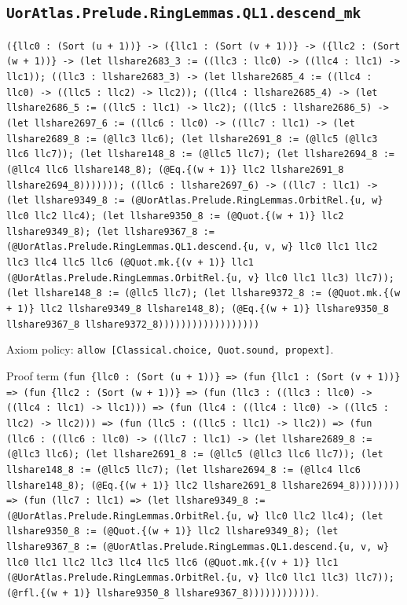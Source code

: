 \documentclass[11pt]{article}
\begin{document}
\subsection*{\texttt{UorAtlas.Prelude.RingLemmas.QL1.descend\_mk}}
\noindent\texttt{(\{llc0 : (Sort (u + 1))\} -> (\{llc1 : (Sort (v + 1))\} -> (\{llc2 : (Sort (w + 1))\} -> (let llshare2683\_3 := ((llc3 : llc0) -> ((llc4 : llc1) -> llc1)); ((llc3 : llshare2683\_3) -> (let llshare2685\_4 := ((llc4 : llc0) -> ((llc5 : llc2) -> llc2)); ((llc4 : llshare2685\_4) -> (let llshare2686\_5 := ((llc5 : llc1) -> llc2); ((llc5 : llshare2686\_5) -> (let llshare2697\_6 := ((llc6 : llc0) -> ((llc7 : llc1) -> (let llshare2689\_8 := (@llc3 llc6); (let llshare2691\_8 := (@llc5 (@llc3 llc6 llc7)); (let llshare148\_8 := (@llc5 llc7); (let llshare2694\_8 := (@llc4 llc6 llshare148\_8); (@Eq.\{(w + 1)\} llc2 llshare2691\_8 llshare2694\_8))))))); ((llc6 : llshare2697\_6) -> ((llc7 : llc1) -> (let llshare9349\_8 := (@UorAtlas.Prelude.RingLemmas.OrbitRel.\{u, w\} llc0 llc2 llc4); (let llshare9350\_8 := (@Quot.\{(w + 1)\} llc2 llshare9349\_8); (let llshare9367\_8 := (@UorAtlas.Prelude.RingLemmas.QL1.descend.\{u, v, w\} llc0 llc1 llc2 llc3 llc4 llc5 llc6 (@Quot.mk.\{(v + 1)\} llc1 (@UorAtlas.Prelude.RingLemmas.OrbitRel.\{u, v\} llc0 llc1 llc3) llc7)); (let llshare148\_8 := (@llc5 llc7); (let llshare9372\_8 := (@Quot.mk.\{(w + 1)\} llc2 llshare9349\_8 llshare148\_8); (@Eq.\{(w + 1)\} llshare9350\_8 llshare9367\_8 llshare9372\_8))))))))))))))))))}\par
\noindent Axiom policy: \texttt{allow [Classical.choice, Quot.sound, propext]}.\par
\noindent Proof term \texttt{(fun \{llc0 : (Sort (u + 1))\} => (fun \{llc1 : (Sort (v + 1))\} => (fun \{llc2 : (Sort (w + 1))\} => (fun (llc3 : ((llc3 : llc0) -> ((llc4 : llc1) -> llc1))) => (fun (llc4 : ((llc4 : llc0) -> ((llc5 : llc2) -> llc2))) => (fun (llc5 : ((llc5 : llc1) -> llc2)) => (fun (llc6 : ((llc6 : llc0) -> ((llc7 : llc1) -> (let llshare2689\_8 := (@llc3 llc6); (let llshare2691\_8 := (@llc5 (@llc3 llc6 llc7)); (let llshare148\_8 := (@llc5 llc7); (let llshare2694\_8 := (@llc4 llc6 llshare148\_8); (@Eq.\{(w + 1)\} llc2 llshare2691\_8 llshare2694\_8)))))))) => (fun (llc7 : llc1) => (let llshare9349\_8 := (@UorAtlas.Prelude.RingLemmas.OrbitRel.\{u, w\} llc0 llc2 llc4); (let llshare9350\_8 := (@Quot.\{(w + 1)\} llc2 llshare9349\_8); (let llshare9367\_8 := (@UorAtlas.Prelude.RingLemmas.QL1.descend.\{u, v, w\} llc0 llc1 llc2 llc3 llc4 llc5 llc6 (@Quot.mk.\{(v + 1)\} llc1 (@UorAtlas.Prelude.RingLemmas.OrbitRel.\{u, v\} llc0 llc1 llc3) llc7)); (@rfl.\{(w + 1)\} llshare9350\_8 llshare9367\_8))))))))))))}.\par
\end{document}
